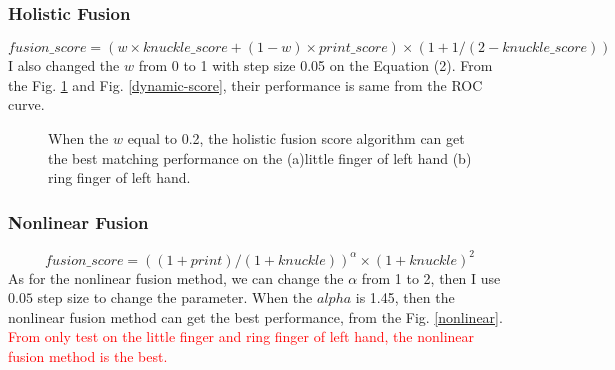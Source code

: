 \subsubsection{Holistic Fusion}
\begin{equation}
    fusion\_score = (w\times knuckle\_score + (1-w) \times print\_score) \times (1 + 1 / (2 - knuckle\_score))
\end{equation}
I also changed the $w$ from 0 to 1 with step size 0.05 on the Equation (2). From the Fig. \ref{holistic} and Fig. \ref{dynamic-score}, their performance is same from the ROC curve.
\begin{figure}[ht!]
    \centering

    \caption{When the $w$ equal to 0.2, the holistic fusion score algorithm can get the best matching performance on the (a)little finger of left hand (b) ring finger of left hand. }
    \label{holistic}
\end{figure}

\subsubsection{Nonlinear Fusion}
\begin{equation}
    fusion\_score = ((1 + print)/(1 + knuckle))^{\alpha} \times (1 + knuckle)^2
\end{equation}
As for the nonlinear fusion method, we can change the $\alpha$ from 1 to 2, then I use $0.05$ step size to change the parameter. When the $alpha$ is 1.45, then the nonlinear fusion method can get the best performance, from the Fig. \ref{nonlinear}. \textcolor{red}{From only test on the little finger and ring finger of left hand, the nonlinear fusion method is the best.}

